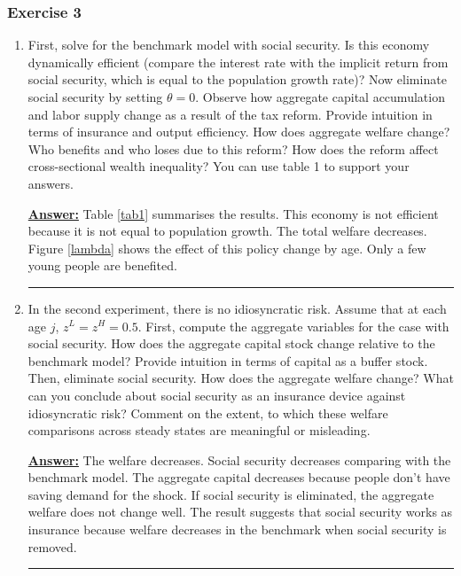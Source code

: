 \documentclass{article} %
\theoremstyle{definition}
\newenvironment{solution}[1][Answer]{\begin{singlespace}\underline{\textbf{#1:}}\quad }{\ \rule{0.3em}{0.3em}\end{singlespace}} %
\begin{document}
\subsubsection*{Exercise 3}
\begin{enumerate}
\item First, solve for the benchmark model with social security. Is this economy dynamically efficient (compare the interest rate with the implicit return from social security, which is equal to the population growth rate)? Now eliminate social security by setting $ \theta = 0 $. Observe how aggregate capital accumulation and labor supply change as a result of the tax reform. Provide intuition in terms of insurance and output efficiency. How does aggregate welfare change? Who benefits and who loses due to this reform? How does the reform affect cross-sectional wealth inequality? You can use table 1 to support your answers.
  \begin{solution}
    Table \ref{tab1} summarises the results. This economy is not efficient because it is not equal to population growth. The total welfare decreases. Figure \ref{lambda} shows the effect of this policy change by age. Only a few young people are benefited. 
  \end{solution}

\item In the second experiment, there is no idiosyncratic risk. Assume that at each age $ j $, $ z^L = z^H = 0.5. $ First, compute the aggregate variables for the case with social security. How does the aggregate capital stock change relative to the benchmark model? Provide intuition in terms of capital as a buffer stock. Then, eliminate social security. How does the aggregate welfare change? What can you conclude about social security as an insurance device against idiosyncratic risk? Comment on the extent, to which these welfare comparisons across steady states are meaningful or misleading.
  \begin{solution}
    The welfare decreases. Social security decreases comparing with the benchmark model. The aggregate capital decreases because people don't have saving demand for the shock. If social security is eliminated, the aggregate welfare does not change well. The result suggests that social security works as insurance because welfare decreases in the benchmark when social security is removed.     
  \end{solution}
  

\end{enumerate}
\end{document}

